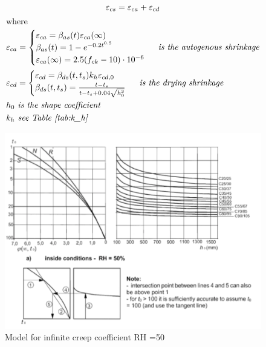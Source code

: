 \documentclass[landscape]{article}
\begin{document}
\begin{multicols*}{2}
\begin{enumerate}
        \begin{gather}\label{eq:2.1}
        \varepsilon_{cs}=\varepsilon_{ca}+\varepsilon_{cd} \\
        \shortintertext{where}
        \begin{aligned}
          & \varepsilon_{ca}= 
          \begin{cases}
            \varepsilon_{ca}= \beta_{as}(t) \varepsilon_{ca}(\infty)\\
            \beta_{as}(t)= 1- e^{-0.2t^{0.5}} \\
            \varepsilon_{ca}(\infty) =2.5(f_{ck}-10)\cdot 10^{-6} 
          \end{cases}\emph{ is the autogenous shrinkage} \\
          & \varepsilon_{cd} =
          \begin{cases}
            \varepsilon_{cd}= \beta_{ds}(t,t_s)k_h \varepsilon_{cd,0}\\
            \beta_{ds}(t,t_s)= \frac{t-t_s}{t-t_s + 0.04   \sqrt{h_0^3} }
        \end{cases} \emph{ is the drying shrinkage} \\
        & h_0 \emph{ is the shape coefficient} \\
        & k_h \emph{ see Table~\ref{tab:k_h}}
        \end{aligned}\notag
        \end{gather}
\end{enumerate}

    \begin{figure}[H]
        \centering
        \includegraphics[width=0.95\linewidth]{img/phi1}
        \caption{Model for infinite creep coefficient RH =50}
        \label{fig:creep_infinity_1}
    \end{figure}


\end{multicols*}
\end{document}
